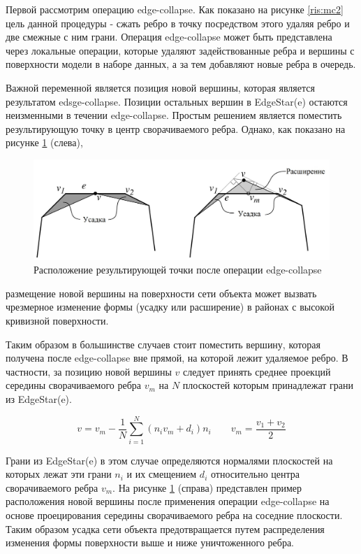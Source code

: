 \documentclass[14pt]{article}
\numberwithin{figure}{section}
\numberwithin{equation}{section}
\begin{document}
Первой рассмотрим операцию edge-collapse. Как показано на рисунке \ref{ris:mc2} цель данной процедуры - сжать ребро в точку посредством этого удаляя ребро и две смежные с ним грани. Операция edge-collapse может быть представлена через локальные операции, которые удаляют задействованные ребра и вершины с поверхности модели в наборе данных, а за тем добавляют новые ребра в очередь.

Важной переменной является позиция новой вершины, которая является результатом edsge-collapse. Позиции остальных вершин в EdgeStar(e) остаются неизменными в течении edge-collapse. Простым решением является поместить результирующую точку в центр сворачиваемого ребра. Однако, как показано на рисунке \ref{ris:mc5} (слева),
\begin{figure}[h]
	\begin{center}
		\includegraphics[scale = 0.47]{mc5.JPG}
		\caption{Расположение результирующей точки после операции edge-collapse}
		\label{ris:mc5}
	\end{center}
\end{figure}
размещение новой вершины на поверхности сети объекта может вызвать чрезмерное изменение формы (усадку или расширение) в районах с высокой кривизной поверхности.

Таким образом в большинстве случаев стоит поместить вершину, которая получена после edge-collapse вне прямой, на которой лежит удаляемое ребро. В частности, за позицию новой вершины $v$ следует принять среднее проекций середины сворачиваемого ребра $v_m$ на $N$ плоскостей которым принадлежат грани из EdgeStar(e).

\begin{equation}
	v = v_m - \frac{1}{N} \sum\limits_{i = 1}^N (n_i v_m + d_i)n_i \qquad v_m = \frac{v_1 + v_2}{2}
\end{equation}

Грани из EdgeStar(e) в этом случае определяются нормалями плоскостей на которых лежат эти грани $n_i$ и их смещением $d_i$ относительно центра сворачиваемого ребра $v_m$. На рисунке \ref{ris:mc5} (справа) представлен пример расположения новой вершины после применения операции edge-collapse на основе проецирования середины сворачиваемого ребра на соседние плоскости. Таким образом усадка сети объекта предотвращается путем распределения изменения формы поверхности выше и ниже уничтоженного ребра.
\end{document}

